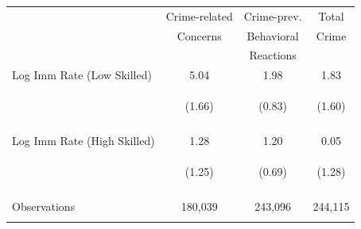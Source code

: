 \begin{center}
\begin{tabular}{lccc}
\hline \noalign{\smallskip} & Crime-related & Crime-prev. & Total\\
 & Concerns & Behavioral & Crime\\
 &  & Reactions & \\
\noalign{\smallskip}\hline \noalign{\smallskip}Log Imm Rate (Low Skilled) & 5.04 & 1.98 & 1.83\\
 & \begin{footnotesize}(1.66)\end{footnotesize} & \begin{footnotesize}(0.83)\end{footnotesize} & \begin{footnotesize}(1.60)\end{footnotesize}\\
 & \begin{footnotesize}[0.003]\end{footnotesize} & \begin{footnotesize}[0.018]\end{footnotesize} & \begin{footnotesize}[0.254]\end{footnotesize}\\
\noalign{\smallskip}Log Imm Rate (High Skilled) & 1.28 & 1.20 & 0.05\\
 & \begin{footnotesize}(1.25)\end{footnotesize} & \begin{footnotesize}(0.69)\end{footnotesize} & \begin{footnotesize}(1.28)\end{footnotesize}\\
 & \begin{footnotesize}[0.308]\end{footnotesize} & \begin{footnotesize}[0.085]\end{footnotesize} & \begin{footnotesize}[0.970]\end{footnotesize}\\
\noalign{\smallskip}Observations & 180,039 & 243,096 & 244,115\\
 & \begin{footnotesize}\end{footnotesize} & \begin{footnotesize}\end{footnotesize} & \begin{footnotesize}\end{footnotesize}\\

\end{tabular}
\end{center}
